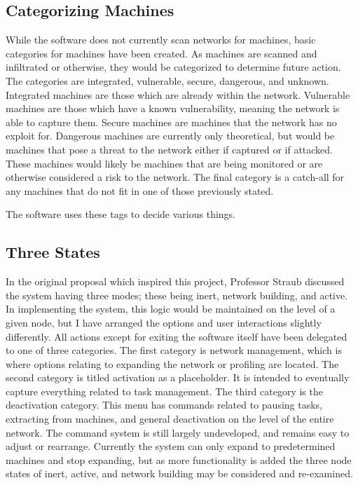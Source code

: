 \subsection{Categorizing Machines}
While the software does not currently scan networks for machines, basic categories for machines have been created. As machines are scanned and infiltrated or otherwise, they would be categorized to determine future action. The categories are integrated, vulnerable, secure, dangerous, and unknown. Integrated machines are those which are already within the network. Vulnerable machines are those which have a known vulnerability, meaning the network is able to capture them. Secure machines are machines that the network has no exploit for. Dangerous machines are currently only theoretical, but would be machines that pose a threat to the network either if captured or if attacked. These machines would likely be machines that are being monitored or are otherwise considered  a risk to the network. The final category is a catch-all for any machines that do not fit in one of those previously stated. 

The software uses these tags to decide various things.
\subsection{Three States}
In the original proposal which inspired this project, Professor Straub discussed the system having three modes; these being inert, network building, and active. In implementing the system, this logic would be maintained on the level of a given node, but I have arranged the options and user interactions slightly differently. All actions except for exiting the software itself have been delegated to one of three categories. The first category is network management, which is where options relating to expanding the network or profiling are located. The second category is titled activation as a placeholder. It is intended to eventually capture everything related to task management. The third category is the deactivation category. This menu has commands related to pausing tasks, extracting from machines, and general deactivation on the level of the entire network. The command system is still largely undeveloped, and remains easy to adjust or rearrange. Currently the system can only expand to predetermined machines and stop expanding, but as more functionality is added the three node states of inert, active, and network building may be considered and re-examined.
